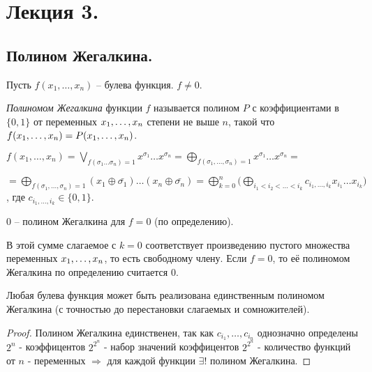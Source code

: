 
\section{Лекция 3.}
\subsection{Полином Жегалкина.} 
Пусть $f(x_1, \ldots, x_n)$ -- булева функция. $f\neq 0$.
\begin{definition} \textit{Полиномом Жегалкина} функции $f$ называется полином $P$ с коэффициентами в $\{0,1\}$ от переменных $x_1, \ldots, x_n$ степени не выше $n$, такой что $f(x_1, \ldots, x_n) = P(x_1, \ldots, x_n)$. \end{definition}
$f(x_1, \ldots, x_n)=\bigvee \limits_{f(\sigma_1 \ldots \sigma_n)=1} x^{\sigma_1} \ldots x^{\sigma_n}=\bigoplus \limits_{f(\sigma_1, \ldots, \sigma_n)=1} x^{\sigma_1} \ldots x^{\sigma_n}=$ 
\begin{flushright}
$
=\bigoplus \limits_{f(\sigma_1, \ldots, \sigma_n)=1} (x_1\oplus \bar{\sigma_1})\ldots(x_n\oplus \bar{\sigma_n})=\bigoplus \limits^n_{k=0} \big( \bigoplus \limits_{i_1<i_2< \ldots<i_k} c_{i_1, \ldots, i_k}x_{i_1} \ldots x_{i_k}\big) $, где  $c_{i_1, \ldots, i_k} \in \{0,1\}$.
\end{flushright} 

$0$ -- полином Жегалкина для $f=0$ (по определению). 

В этой сумме слагаемое с $k=0$ соответствует произведению пустого множества переменных $x_1, \ldots, x_n$, то есть свободному члену. 
Если $f=0$, то её полиномом Жегалкина по определению считается $0$.
\begin{statement}
	Любая булева функция может быть реализована единственным полиномом Жегалкина (с точностью до перестановки слагаемых и сомножителей). 
\end{statement}
\begin{proof}
	Полином Жегалкина единственен, так как $c_{i_1}, \ldots, c_{i_n}$ однозначно определены $2^n$ -  коэффицентов $2^{2^n}$ - набор значений коэффицентов $2^{2^n}$ - количество функций от $n$ - переменных $\Rightarrow$ для каждой функции $\exists !$ полином Жегалкина. 
\end{proof}
